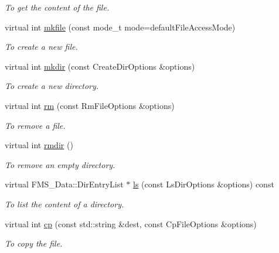 \begin{DoxyCompactItemize}
\begin{DoxyCompactList}\small\item\em To get the content of the file. \item\end{DoxyCompactList}\item 
virtual int \hyperlink{classRemoteFileProxy_a3306f92d078a55a0435d4b921b24ed38}{mkfile} (const mode\_\-t mode=defaultFileAccessMode)
\begin{DoxyCompactList}\small\item\em To create a new file. \item\end{DoxyCompactList}\item 
virtual int \hyperlink{classRemoteFileProxy_abf6ea94a4d8960caf0ff14adf2587082}{mkdir} (const CreateDirOptions \&options)
\begin{DoxyCompactList}\small\item\em To create a new directory. \item\end{DoxyCompactList}\item 
virtual int \hyperlink{classRemoteFileProxy_a8e849fd6f8d78e14114e14a2eaacb75a}{rm} (const RmFileOptions \&options)
\begin{DoxyCompactList}\small\item\em To remove a file. \item\end{DoxyCompactList}\item 
virtual int \hyperlink{classRemoteFileProxy_abfde4c2173294f6dfd5958a8b6c88cdb}{rmdir} ()
\begin{DoxyCompactList}\small\item\em To remove an empty directory. \item\end{DoxyCompactList}\item 
virtual FMS\_\-Data::DirEntryList $\ast$ \hyperlink{classRemoteFileProxy_a8e09c4e49112a6961df4c21e32d467f7}{ls} (const LsDirOptions \&options) const 
\begin{DoxyCompactList}\small\item\em To list the content of a directory. \item\end{DoxyCompactList}\item 
virtual int \hyperlink{classRemoteFileProxy_a17ea6be4c77a0779317c69b0eb21b793}{cp} (const std::string \&dest, const CpFileOptions \&options)
\begin{DoxyCompactList}\small\item\em To copy the file. \item\end{DoxyCompactList}\item 

\end{DoxyCompactItemize}
